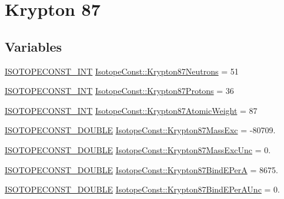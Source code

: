 \hypertarget{group___isotope_const-_krypton-_kr87}{}\section{Krypton 87}
\label{group___isotope_const-_krypton-_kr87}
\subsection*{Variables}
\begin{DoxyCompactItemize}
\item 
\mbox{\hyperlink{group___isotope_const-_macros_ga5f18360b3e99483a35c32d789e62621c}{I\+S\+O\+T\+O\+P\+E\+C\+O\+N\+S\+T\+\_\+\+I\+NT}} \mbox{\hyperlink{group___isotope_const-_krypton-_kr87_gaf8ab932a7270476736124b3acc5af9d2}{Isotope\+Const\+::\+Krypton87\+Neutrons}} = 51
\item 
\mbox{\hyperlink{group___isotope_const-_macros_ga5f18360b3e99483a35c32d789e62621c}{I\+S\+O\+T\+O\+P\+E\+C\+O\+N\+S\+T\+\_\+\+I\+NT}} \mbox{\hyperlink{group___isotope_const-_krypton-_kr87_ga7e506ec5946d053221dfcfbd4c302aee}{Isotope\+Const\+::\+Krypton87\+Protons}} = 36
\item 
\mbox{\hyperlink{group___isotope_const-_macros_ga5f18360b3e99483a35c32d789e62621c}{I\+S\+O\+T\+O\+P\+E\+C\+O\+N\+S\+T\+\_\+\+I\+NT}} \mbox{\hyperlink{group___isotope_const-_krypton-_kr87_ga3b91e43a1209c5ae2005ceb4162a633c}{Isotope\+Const\+::\+Krypton87\+Atomic\+Weight}} = 87
\item 
\mbox{\hyperlink{group___isotope_const-_macros_ga8f45a7272ce02c0b4c65c44636ed719a}{I\+S\+O\+T\+O\+P\+E\+C\+O\+N\+S\+T\+\_\+\+D\+O\+U\+B\+LE}} \mbox{\hyperlink{group___isotope_const-_krypton-_kr87_ga71805b10b8c7f432c23f5c73fd327ba2}{Isotope\+Const\+::\+Krypton87\+Mass\+Exc}} = -\/80709.
\item 
\mbox{\hyperlink{group___isotope_const-_macros_ga8f45a7272ce02c0b4c65c44636ed719a}{I\+S\+O\+T\+O\+P\+E\+C\+O\+N\+S\+T\+\_\+\+D\+O\+U\+B\+LE}} \mbox{\hyperlink{group___isotope_const-_krypton-_kr87_ga0c9c86932b5d438f665c2db8c0775873}{Isotope\+Const\+::\+Krypton87\+Mass\+Exc\+Unc}} = 0.
\item 
\mbox{\hyperlink{group___isotope_const-_macros_ga8f45a7272ce02c0b4c65c44636ed719a}{I\+S\+O\+T\+O\+P\+E\+C\+O\+N\+S\+T\+\_\+\+D\+O\+U\+B\+LE}} \mbox{\hyperlink{group___isotope_const-_krypton-_kr87_ga2aae06591751ae9d86ae7fe23d33fe13}{Isotope\+Const\+::\+Krypton87\+Bind\+E\+PerA}} = 8675.
\item 
\mbox{\hyperlink{group___isotope_const-_macros_ga8f45a7272ce02c0b4c65c44636ed719a}{I\+S\+O\+T\+O\+P\+E\+C\+O\+N\+S\+T\+\_\+\+D\+O\+U\+B\+LE}} \mbox{\hyperlink{group___isotope_const-_krypton-_kr87_ga444a49f474c983821c62f0e704b30789}{Isotope\+Const\+::\+Krypton87\+Bind\+E\+Per\+A\+Unc}} = 0.

\end{DoxyCompactItemize}
